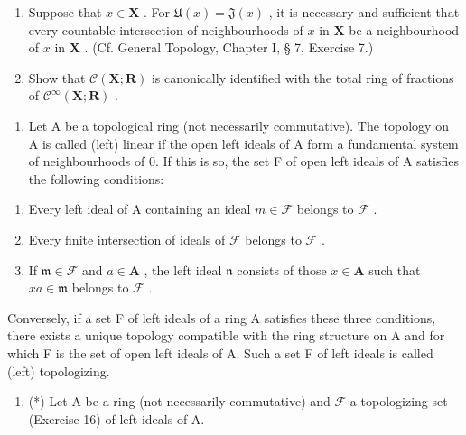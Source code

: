 \begin{enumerate}
\item
  Suppose that \(x \in \mathbf{X}\) . For \(\mathfrak{U}(x) = \mathfrak{J}(x)\) , it is necessary and sufficient that every countable intersection of neighbourhoods of \(x\) in \(\mathbf{X}\) be a neighbourhood of \(x\) in \(\mathbf{X}\) . (Cf. General Topology, Chapter I, § 7, Exercise 7.)
\item
  Show that \(\mathcal{C}(\mathbf{X};\mathbf{R})\) is canonically identified with the total ring of fractions of \(\mathcal{C}^{\infty}(\mathbf{X};\mathbf{R})\) .
\end{enumerate}

\begin{enumerate}
\def\labelenumi{\arabic{enumi}.}
\setcounter{enumi}{15}
\tightlist
\item
  Let A be a topological ring (not necessarily commutative). The topology on A is called (left) linear if the open left ideals of A form a fundamental system of neighbourhoods of 0. If this is so, the set F of open left ideals of A satisfies the following conditions:
\end{enumerate}

\begin{enumerate}
\def\labelenumi{(\arabic{enumi})}
\item
  Every left ideal of A containing an ideal \(m \in \mathcal{F}\) belongs to \(\mathcal{F}\) .
\item
  Every finite intersection of ideals of \(\mathcal{F}\) belongs to \(\mathcal{F}\) .
\item
  If \(\mathfrak{m} \in \mathcal{F}\) and \(a \in \mathbf{A}\) , the left ideal \(\mathfrak{n}\) consists of those \(x \in \mathbf{A}\) such that \(xa \in \mathfrak{m}\) belongs to \(\mathcal{F}\) .
\end{enumerate}

Conversely, if a set F of left ideals of a ring A satisfies these three conditions, there exists a unique topology compatible with the ring structure on A and for which F is the set of open left ideals of A. Such a set F of left ideals is called (left) topologizing.

\begin{enumerate}
\def\labelenumi{\arabic{enumi}.}
\setcounter{enumi}{16}
\tightlist
\item
  (*) Let A be a ring (not necessarily commutative) and \(\mathcal{F}\) a topologizing set (Exercise 16) of left ideals of A.
\end{enumerate}

